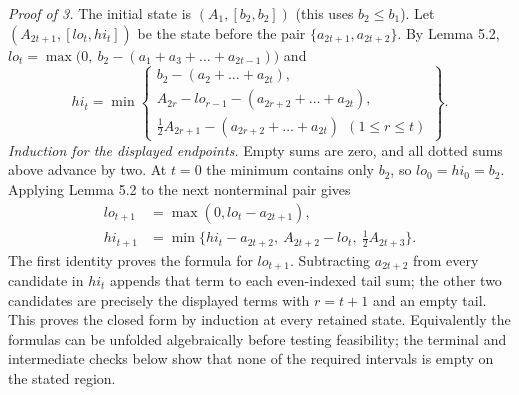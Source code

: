 \documentclass[
  11pt,
  a4paper,
]{article}
\newcounter{none} %
\begin{document}
\emph{Proof of 3.} The initial state is \((A_1,\allowbreak{}[b_2,\allowbreak{}b_2])\) (this uses
\(b_2\le b_1\)). Let \((A_{2t+1},\allowbreak{}[lo_t,\allowbreak{}hi_t])\) be the state before the
pair \(\{a_{2t+1},\allowbreak{}a_{2t+2}\}\). By Lemma 5.2,
\(lo_t=\max\big(0,\allowbreak{}\ b_2-(a_1+a_3+\dots+a_{2t-1})\big)\) and
\[hi_t=\min\left\{\begin{gathered}b_2-(a_2+\dots+a_{2t}),\\ A_{2r}-lo_{r-1}-(a_{2r+2}+\dots+a_{2t}),\\ \tfrac12A_{2r+1}-(a_{2r+2}+\dots+a_{2t})\ \ (1\le r\le t)\end{gathered}\right\}.\]
\emph{Induction for the displayed endpoints.} Empty sums are zero, and
all dotted sums above advance by two. At \(t=0\) the minimum contains
only \(b_2\), so \(lo_0=hi_0=b_2\). Applying Lemma 5.2 to the next
nonterminal pair gives \[\begin{aligned}
lo_{t+1}&=\max(0,lo_t-a_{2t+1}),\\
hi_{t+1}&=\min\{hi_t-a_{2t+2},\ A_{2t+2}-lo_t,\ \tfrac12 A_{2t+3}\}.
\end{aligned}\] The first identity proves the formula for \(lo_{t+1}\).
Subtracting \(a_{2t+2}\) from every candidate in \(hi_t\) appends that
term to each even-indexed tail sum; the other two candidates are
precisely the displayed terms with \(r=t+1\) and an empty tail. This
proves the closed form by induction at every retained state.
Equivalently the formulas can be unfolded algebraically before testing
feasibility; the terminal and intermediate checks below show that none
of the required intervals is empty on the stated region.
\end{document}
